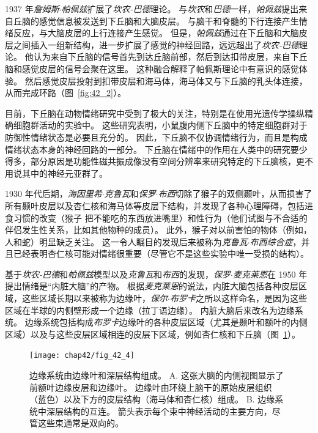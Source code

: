1937 年\textit{詹姆斯$\cdot$帕佩兹}扩展了\textit{坎农-巴德}理论。
与\textit{坎农}和\textit{巴德}一样，\textit{帕佩兹}提出来自丘脑的感觉信息被发送到下丘脑和大脑皮层。
与脑干和脊髓的下行连接产生情绪反应，与大脑皮层的上行连接产生感觉。
但是，\textit{帕佩兹}通过在下丘脑和大脑皮层之间插入一组新结构，进一步扩展了感觉的神经回路，远远超出了\textit{坎农-巴德}理论。
他认为来自下丘脑的信号首先到达丘脑前部，然后到达扣带皮层，来自下丘脑和感觉皮层的信号会聚在这里。
这种融合解释了帕佩斯理论中有意识的感觉体验。
然后感觉皮层投射到扣带皮层和海马体，海马体又与下丘脑的乳头体连接，从而完成环路（图~\ref{fig:42_2}）。


目前，下丘脑在动物情绪研究中受到了极大的关注，特别是在使用光遗传学操纵精确细胞群活动的实验中。
这些研究表明，小鼠腹内侧下丘脑中的特定细胞群对于防御性情绪状态是必要且充分的。
因此，下丘脑不仅协调情绪行为，而且是构成情绪状态本身的神经回路的一部分。
下丘脑在情绪中的作用在人类中的研究要少得多，部分原因是功能性磁共振成像没有空间分辨率来研究特定的下丘脑核，更不用说其中的神经元亚群了。


1930 年代后期，\textit{海因里希$\cdot$克鲁瓦}和\textit{保罗$\cdot$布西}切除了猴子的双侧颞叶，从而损害了所有颞叶皮层以及杏仁核和海马体等皮层下结构，并发现了各种心理障碍，包括进食习惯的改变（猴子 把不能吃的东西放进嘴里）和性行为（他们试图与不合适的伴侣发生性关系，比如其他物种的成员）。
此外，猴子对以前害怕的物体（例如，人和蛇）明显缺乏关注。
这一令人瞩目的发现后来被称为\textit{克鲁瓦$\cdot$布西综合症}，并且已经表明杏仁核可能对情绪很重要（尽管它不是这些实验中唯一受损的结构）。


基于\textit{坎农-巴德}和\textit{帕佩兹}模型以及\textit{克鲁瓦}和\textit{布西}的发现，\textit{保罗$\cdot$麦克莱恩}在 1950 年提出情绪是“内脏大脑”的产物。
根据\textit{麦克莱恩}的说法，内脏大脑包括各种皮层区域，这些区域长期以来被称为边缘叶，\textit{保尔$\cdot$布罗卡}之所以这样命名，是因为这些区域在半球的内侧壁形成一个边缘（拉丁语边缘）。
内脏大脑后来改名为边缘系统。
边缘系统包括构成\textit{布罗卡}边缘叶的各种皮层区域（尤其是颞叶和额叶的内侧区域）以及与这些皮层区域相连的皮层下区域，例如杏仁核和下丘脑（图~\ref{fig:42_4}）。


\begin{figure}[htbp]
	\centering
	\texttt{[image: chap42/fig\_42\_4]}
	\caption{边缘系统由边缘叶和深层结构组成\cite{nieuwenhuys2007human}。
		A. 这张大脑的内侧视图显示了前额叶边缘皮层和边缘叶。
		边缘叶由环绕上脑干的原始皮层组织（蓝色）以及下方的皮层结构（海马体和杏仁核）组成。
		B. 边缘系统中深层结构的互连。
		箭头表示每个束中神经活动的主要方向，尽管这些束通常是双向的。}
	\label{fig:42_4}
\end{figure}


